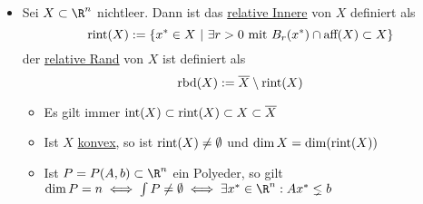 \begin{itemize}
	\item Sei $X \subset \R^n$ nichtleer. Dann ist das \underline{relative Innere} von $X$ definiert als
		\begin{equation*}
			\text{rint}(X):= \left\{ x^* \in X \ |\ \exists r >0 \text{ mit } B_{r}(x^*)\cap\text{aff}(X) \subset X \right\}
		\end{equation*}
		der \underline{relative Rand} von $X$ ist definiert als
		\begin{equation*}
			\text{rbd}(X) := \overline{X}\setminus \text{rint}(X)
		\end{equation*}
	\begin{bemerkung}
		\begin{itemize}\
			\item Es gilt immer $\text{int}(X)\subset \text{rint}(X) \subset X \subset \overline{X}$
			\item Ist $X$ \underline{konvex}, so ist $\text{rint}(X)\neq \emptyset$ und $\dim X= \dim(\text{rint}(X))$
			\item Ist  $P = P(A,b) \subset \R^n$ ein Polyeder, so gilt $\dim P=n \iff \int P \neq \emptyset \iff \exists x^* \in \R^n: Ax^*\lneq b$
		\end{itemize}
	\end{bemerkung}
\end{itemize}
